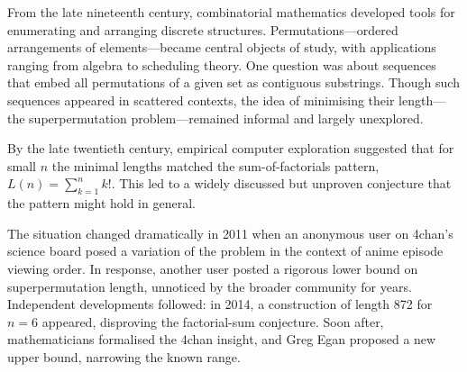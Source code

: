 \begin{historical}
From the late nineteenth century, combinatorial mathematics developed tools for enumerating and arranging discrete structures. Permutations—ordered arrangements of elements—became central objects of study, with applications ranging from algebra to scheduling theory. One question was about sequences that embed all permutations of a given set as contiguous substrings. Though such sequences appeared in scattered contexts, the idea of minimising their length—the superpermutation problem—remained informal and largely unexplored.

By the late twentieth century, empirical computer exploration suggested that for small $n$ the minimal lengths matched the sum-of-factorials pattern, $L(n)=\sum_{k=1}^n k!$. This led to a widely discussed but unproven conjecture that the pattern might hold in general.

The situation changed dramatically in 2011 when an anonymous user on 4chan’s science board posed a variation of the problem in the context of anime episode viewing order. In response, another user posted a rigorous lower bound on superpermutation length, unnoticed by the broader community for years. Independent developments followed: in 2014, a construction of length 872 for $n=6$ appeared, disproving the factorial-sum conjecture. Soon after, mathematicians formalised the 4chan insight, and Greg Egan proposed a new upper bound, narrowing the known range.

\end{historical}